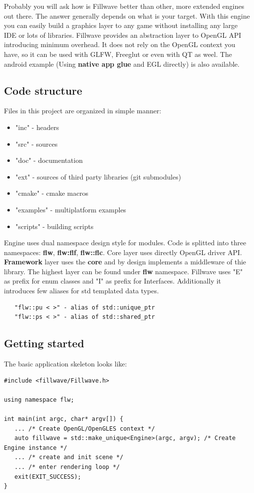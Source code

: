 \documentclass{article}
\begin{document}
Probably you will ask how is Fillwave better than other, more extended engines out there. The answer generally depends on what is your target. With this engine you can easily build a graphics layer to any game without installing any large IDE or lots of libraries. Fillwave provides an abstraction layer to OpenGL API introducing minimum overhead. It does not rely on the OpenGL context you have, so it can be used with GLFW, Freeglut or even with QT as weel. The android example (Using \textbf{native app glue} and EGL directly) is also available.\newpage

\subsection{Code structure}\label{sec:Code structure}
\indent Files in this project are organized in simple manner:
\begin{itemize}
  \item "inc" - headers
  \item "src" - sources
  \item "doc" - documentation
  \item "ext" - sources of third party libraries (git submodules)
  \item "cmake" - cmake macros
  \item "examples" - multiplatform examples
  \item "scripts" - building scripts
\end{itemize}
\indent \indent Engine uses dual namespace design style for modules. Code is splitted into three namespaces: \textbf{flw}, \textbf{flw:flf}, \textbf{flw::flc}. Core layer uses directly OpenGL driver API. \textbf{Framework} layer uses the \textbf{core} and by design implements a middleware of thie library. The highest layer can be found under \textbf{flw} namespace. Fillwave uses "E" as prefix for enum classes and "I" as prefix for Interfaces. Additionally it introduces few aliases for std templated data types.
\begin{lstlisting}
   "flw::pu < >" - alias of std::unique_ptr
   "flw::ps < >" - alias of std::shared_ptr
\end{lstlisting}
\subsection{Getting started}\label{sec:Getting started}
\indent \indent The basic application skeleton looks like:

\begin{lstlisting}
#include <fillwave/Fillwave.h>

using namespace flw;

int main(int argc, char* argv[]) {
   ... /* Create OpenGL/OpenGLES context */
   auto fillwave = std::make_unique<Engine>(argc, argv); /* Create Engine instance */
   ... /* create and init scene */
   ... /* enter rendering loop */
   exit(EXIT_SUCCESS);
}
\end{lstlisting}
\end{document}
